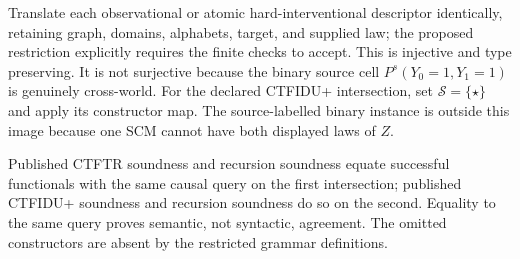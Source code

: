 Translate each observational or atomic hard-interventional descriptor identically, retaining graph, domains, alphabets, target, and supplied law; the proposed restriction explicitly requires the finite checks to accept.  This is injective and type preserving.  It is not surjective because the binary source cell \(P^s(Y_0=1,Y_1=1)\) is genuinely cross-world.  For the declared CTFIDU+ intersection, set \(\mathcal S=\{\star\}\) and apply its constructor map.  The source-labelled binary instance is outside this image because one SCM cannot have both displayed laws of \(Z\).

Published CTFTR soundness and recursion soundness equate successful functionals with the same causal query on the first intersection; published CTFIDU+ soundness and recursion soundness do so on the second.  Equality to the same query proves semantic, not syntactic, agreement.  The omitted constructors are absent by the restricted grammar definitions.
